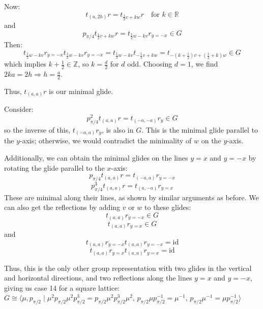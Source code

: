 \documentclass[12pt, letterpaper]{article}
\theoremstyle{definition}
\begin{document}
Now:
\[
t_{(a,2h)} r = t_{\frac{1}{2}v + k w} r \quad \text{for } k \in \mathbb{R}
\]
and
\[
p_{\pi/4} t_{\frac{1}{2}v + k w} r = t_{\frac{1}{2}w - k v} r_{y = -x} \in G
\]
Then:
\[
t_{\frac{1}{2}w - k v} r_{y = -x} t_{\frac{1}{2}w - k v} r_{y = -x} = t_{\frac{1}{2}w - k v} t_{-\frac{1}{2}v + k w} = t_{-(k + \frac{1}{2})v + \left(\frac{1}{2} + k\right)w} \in G
\]
which implies \( k + \frac{1}{2} \in \mathbb{Z} \), so \( k = \frac{d}{2} \) for \( d \) odd. Choosing \( d = 1 \), we find \( 2ka = 2h \Rightarrow h = \frac{a}{2} \).

Thus, \( t_{(a,a)}r \) is our minimal glide. 

Consider:
\[
p_{\pi/4}^2 t_{(a,a)} r = t_{(-a,-a)} r_y \in G
\]
so the inverse of this, \( t_{(-a,a)} r_y \), is also in \( G \). This is the minimal glide parallel to the \( y \)-axis; otherwise, we would contradict the minimality of \( w \) on the \( y \)-axis.

Additionally, we can obtain the minimal glides on the lines \( y = x \) and \( y = -x \) by rotating the glide parallel to the \( x \)-axis:
\[
p_{\pi/4} t_{(a,a)} r = t_{(-a,a)} r_{y = -x}
\]
\[
p_{\pi/4}^3 t_{(a,a)} r = t_{(a,-a)} r_{y = x}
\]
These are minimal along their lines, as shown by similar arguments as before. We can also get the reflections by adding \( v \) or \( w \) to these glides:
\[
t_{(a,a)} r_{y = -x} \in G
\]
\[
t_{(a,a)} r_{y = x} \in G
\]
and
\[
t_{(a,a)} r_{y = -x} t_{(a,a)} r_{y = -x} = \text{id}
\]
\[
t_{(a,a)} r_{y = x} t_{(a,a)} r_{y = x} = \text{id}
\]

Thus, this is the only other group representation with two glides in the vertical and horizontal directions, and two reflections along the lines \( y = x \) and \( y = -x \), giving us case 14 for a square lattice:
\phantom{text}\\
$G \cong \langle \mu, p_{\pi/2} \mid \mu^2 p_{\pi/2} \mu^2 p_{\pi/2}^3 = p_{\pi/2} \mu^2 p_{\pi/2}^3 \mu^2, \, p_{\pi/2} \mu p_{\pi/2}^{-1} = \mu^{-1}, \, p_{\pi/2} \mu^{-1} = \mu p_{\pi/2}^{-1} \rangle
$


\newpage
\end{document}
